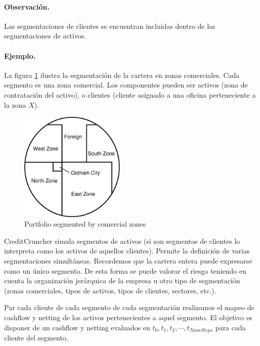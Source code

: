 \paragraph{Observaci\'on.} Las segmentaciones de clientes se encuentran
incluidas dentro de las segmentaciones de activos.

\paragraph{Ejemplo.} La figura \ref{fig:segments} ilustra la segmentaci\'on
de la cartera en zonas comerciales. Cada segmento es una zona comercial.
Los componentes pueden ser activos (zona de contrataci\'on del activo), o
clientes (cliente asignado a una oficina perteneciente a la zona $X$).

\begin{figure}[!hb]
\begin{center}
\includegraphics[width=5cm,angle=0]{./images/segments.eps}
\caption{Portfolio segmented by comercial zones}
\label{fig:segments}
\end{center}
\end{figure}

CreditCruncher simula segmentos de activos (si son segmentos de clientes lo
interpreta como los activos de aquellos clientes). Permite la definici\'on
de varias segmentaciones simult\'aneas. Recordemos que la cartera entera
puede expresarse como un \'unico segmento. De esta forma se puede valorar
el riesgo teniendo en cuenta la organizaci\'on jer\'arquica de la empresa
u otro tipo de segmentaci\'on (zonas comerciales, tipos de activos, tipos de
clientes, sectores, etc.).
\newline

Par cada cliente de cada segmento de cada segmentaci\'on realizamos el
mapeo de cashflow y netting de los activos pertenecientes a aquel
segmento. El objetivo es disponer de un cashflow y netting evaluados en
$t_0, t_1, t_2, \cdots, t_{NumSteps}$ para cada cliente del segmento.

